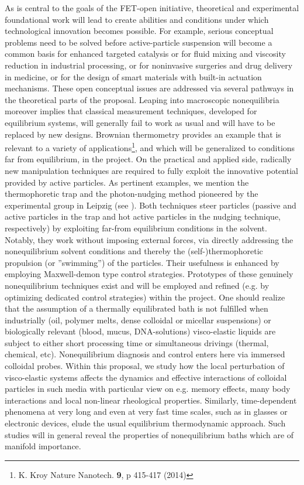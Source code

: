  As is central to the goals
of the FET-open initiative, theoretical and experimental foundational work will lead to
create abilities and conditions under which technological innovation becomes possible.  For
example, serious conceptual problems need to be solved before active-particle suspension
will become a common basis for enhanced targeted catalysis or for fluid mixing and viscosity
reduction in industrial processing, or for noninvasive surgeries and drug delivery in
medicine, or for the design of smart materials with built-in actuation mechanisms. These
open conceptual issues are addressed via several pathways in the theoretical parts of the
proposal.  Leaping into macroscopic nonequilibria moreover implies that classical
measurement techniques, developed for equilibrium systems, will generally fail to work as
usual and will have to be replaced by new designs. Brownian thermometry provides an example
that is relevant to a variety of applications\footnote{K. Kroy Nature Nanotech. {\bf 9}, p 415-417 (2014)}, and which will be
generalized to conditions far from equilibrium, in the project.  On the practical and
applied side, radically new manipulation techniques are required to fully exploit the
innovative potential provided by active particles. As pertinent examples, we mention the
thermophoretic trap and the photon-nudging method pioneered by the experimental group in
Leipzig (see ).  Both techniques steer particles (passive
and active particles in the trap and hot active particles in the nudging technique,
respectively) by exploiting far-from equilibrium conditions in the solvent. Notably, they
work without imposing external forces, via directly addressing the nonequilibrium solvent
conditions and thereby the (self-)thermophoretic propulsion (or ''swimming'') of the
particles. Their usefulness is enhanced by employing Maxwell-demon type control
strategies. Prototypes of these genuinely nonequilibrium techniques exist and will be
employed and refined (e.g. by optimizing dedicated control strategies) within the project.
%
One should realize that the assumption of a thermally equilibrated bath is not fulfilled
when industrially (oil, polymer melts, dense colloidal or micellar suspensions) or
biologically relevant (blood, mucus, DNA-solutions) visco-elastic liquids are subject to
either short processing time or simultaneous drivings (thermal, chemical,
etc). Nonequilibrium diagnosis and control enters here via immersed colloidal probes.
%
Within this proposal, we
study how the local perturbation of visco-elastic systems affects the dynamics and
effective interactions of colloidal particles in such media with particular view on
e.g. memory effects, many body interactions and local non-linear rheological properties.
Similarly, time-dependent phenomena at very long and even at very fast time scales, such as
in glasses or electronic devices, elude the usual equilibrium thermodynamic
approach.  Such studies will in general reveal the properties of nonequilibrium baths which
are of manifold importance.

